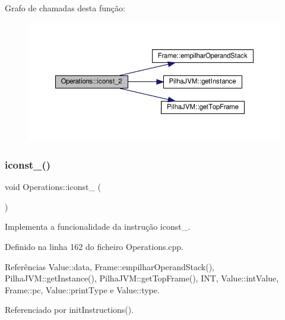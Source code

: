 Grafo de chamadas desta função\+:
\nopagebreak
\begin{figure}[H]
\begin{center}
\leavevmode
\includegraphics[width=350pt]{classOperations_af1a4f99f0d99da0a7db7fc926932a3c8_cgraph}
\end{center}
\end{figure}
\mbox{\label{classOperations_ab8466864c000152e75172b623704f610}} 
\subsubsection{\texorpdfstring{iconst\+\_()}{iconst\_3()}}
{\footnotesize\ttfamily void Operations\+::iconst\+\_ (\begin{DoxyParamCaption}{ }\end{DoxyParamCaption})\hspace{0.3cm}{\ttfamily [private]}}



Implementa a funcionalidade da instrução iconst\+\_. 



Definido na linha 162 do ficheiro Operations.\+cpp.



Referências Value\+::data, Frame\+::empilhar\+Operand\+Stack(), Pilha\+J\+V\+M\+::get\+Instance(), Pilha\+J\+V\+M\+::get\+Top\+Frame(), I\+NT, Value\+::int\+Value, Frame\+::pc, Value\+::print\+Type e Value\+::type.



Referenciado por init\+Instructions().

